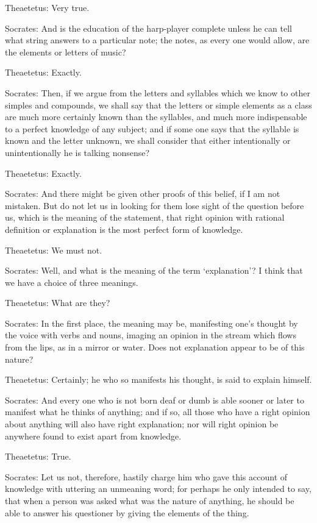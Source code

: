Theaetetus: Very true.

Socrates: And is the education of the harp-player complete unless he can
tell what string answers to a particular note; the notes, as every one
would allow, are the elements or letters of music?

Theaetetus: Exactly.

Socrates: Then, if we argue from the letters and syllables which we know
to other simples and compounds, we shall say that the letters or simple
elements as a class are much more certainly known than the syllables,
and much more indispensable to a perfect knowledge of any subject; and
if some one says that the syllable is known and the letter unknown,
we shall consider that either intentionally or unintentionally he is
talking nonsense?

Theaetetus: Exactly.

Socrates: And there might be given other proofs of this belief, if I am
not mistaken. But do not let us in looking for them lose sight of the
question before us, which is the meaning of the statement, that right
opinion with rational definition or explanation is the most perfect form
of knowledge.

Theaetetus: We must not.

Socrates: Well, and what is the meaning of the term `explanation'? I
think that we have a choice of three meanings.

Theaetetus: What are they?

Socrates: In the first place, the meaning may be, manifesting one's
thought by the voice with verbs and nouns, imaging an opinion in the
stream which flows from the lips, as in a mirror or water. Does not
explanation appear to be of this nature?

Theaetetus: Certainly; he who so manifests his thought, is said to
explain himself.

Socrates: And every one who is not born deaf or dumb is able sooner or
later to manifest what he thinks of anything; and if so, all those who
have a right opinion about anything will also have right explanation;
nor will right opinion be anywhere found to exist apart from knowledge.

Theaetetus: True.

Socrates: Let us not, therefore, hastily charge him who gave this
account of knowledge with uttering an unmeaning word; for perhaps he
only intended to say, that when a person was asked what was the nature
of anything, he should be able to answer his questioner by giving the
elements of the thing.

